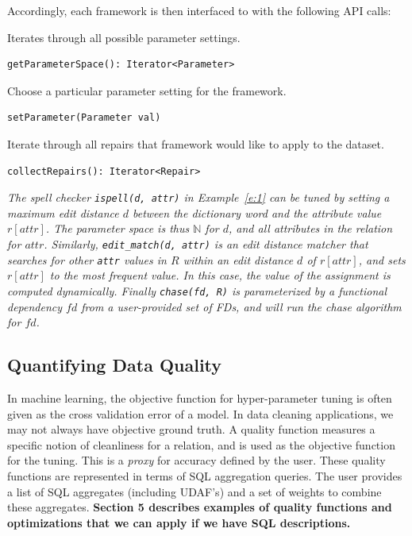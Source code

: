 Accordingly, each framework is then interfaced to \sys with the following API calls:

\vspace{0.5em}

\noindent Iterates through all possible parameter settings.
\begin{lstlisting}
getParameterSpace(): Iterator<Parameter>
\end{lstlisting}

\noindent Choose a particular parameter setting for the framework.
\begin{lstlisting}
setParameter(Parameter val)
\end{lstlisting}

\noindent Iterate through all repairs that framework would like to apply to the dataset.
\begin{lstlisting}
collectRepairs(): Iterator<Repair>
\end{lstlisting}

\begin{example}\it\label{e:2}
  The spell checker  \texttt{ispell(d, attr)} in Example~\ref{e:1} can be tuned by setting a maximum edit distance $d$ between the dictionary word and the attribute value $r[attr]$.  The parameter space is thus $\mathbb{N}$ for $d$, and all attributes in the relation for $attr$. Similarly, \texttt{edit\_match(d, attr)} is an edit distance matcher that searches for other \texttt{attr} values in $R$ within an edit distance $d$ of $r[attr]$, and sets $r[attr]$ to the most frequent value.  In this case, the value of the assignment is computed dynamically.  Finally \texttt{chase(fd, R)} is parameterized by a functional dependency $fd$ from a user-provided set of FDs, and will run the chase algorithm~\cite{Deutsch2008TheCR} for $fd$. 
\end{example}

\subsection{Quantifying Data Quality}
In machine learning, the objective function for hyper-parameter tuning is often given as the cross validation error of a model. In data cleaning applications, we may not always have objective ground truth. 
A quality function measures a specific notion of cleanliness for a relation, and is used as the objective function for the tuning.  
This is a \emph{proxy} for accuracy defined by the user.
These quality functions are represented in terms of SQL aggregation queries. The user provides a list of SQL aggregates (including UDAF's) and a set of weights to combine these aggregates. 
\textbf{Section 5 describes examples of quality functions and optimizations that we can apply if we have SQL descriptions.}

